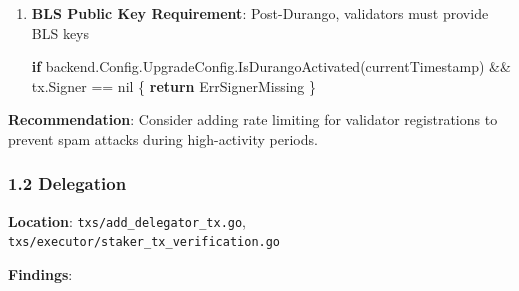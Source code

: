 \documentclass[
]{article}
\newenvironment{Shaded}{}{}
\newcommand{\ControlFlowTok}[1]{\textcolor[rgb]{0.00,0.44,0.13}{\textbf{#1}}}
\newcommand{\NormalTok}[1]{#1}
\newcommand{\OperatorTok}[1]{\textcolor[rgb]{0.40,0.40,0.40}{#1}}
\newcommand{\OtherTok}[1]{\textcolor[rgb]{0.00,0.44,0.13}{#1}}
\begin{document}
\begin{enumerate}
\begin{Shaded}
\begin{Highlighting}[]
\ControlFlowTok{if}\NormalTok{ chainState}\OperatorTok{.}\NormalTok{GetCurrentValidator}\OperatorTok{(}\NormalTok{constants}\OperatorTok{.}\NormalTok{PrimaryNetworkID}\OperatorTok{,}\NormalTok{ nodeID}\OperatorTok{)} \OperatorTok{!=} \OtherTok{nil} \OperatorTok{\{}
    \ControlFlowTok{return}\NormalTok{ ErrAlreadyValidator}
\OperatorTok{\}}
\ControlFlowTok{if}\NormalTok{ chainState}\OperatorTok{.}\NormalTok{GetPendingValidator}\OperatorTok{(}\NormalTok{constants}\OperatorTok{.}\NormalTok{PrimaryNetworkID}\OperatorTok{,}\NormalTok{ nodeID}\OperatorTok{)} \OperatorTok{!=} \OtherTok{nil} \OperatorTok{\{}
    \ControlFlowTok{return}\NormalTok{ ErrAlreadyValidator}
\OperatorTok{\}}
\end{Highlighting}
\end{Shaded}
\item
  \textbf{BLS Public Key Requirement}: Post-Durango, validators must
  provide BLS keys

\begin{Shaded}
\begin{Highlighting}[]
\ControlFlowTok{if}\NormalTok{ backend}\OperatorTok{.}\NormalTok{Config}\OperatorTok{.}\NormalTok{UpgradeConfig}\OperatorTok{.}\NormalTok{IsDurangoActivated}\OperatorTok{(}\NormalTok{currentTimestamp}\OperatorTok{)} \OperatorTok{\&\&}\NormalTok{ tx}\OperatorTok{.}\NormalTok{Signer }\OperatorTok{==} \OtherTok{nil} \OperatorTok{\{}
    \ControlFlowTok{return}\NormalTok{ ErrSignerMissing}
\OperatorTok{\}}
\end{Highlighting}
\end{Shaded}
\end{enumerate}

\textbf{Recommendation}: Consider adding rate limiting for validator
registrations to prevent spam attacks during high-activity periods.

\subsubsection{1.2 Delegation}\label{12-delegation}

\textbf{Location}: \texttt{txs/add\_delegator\_tx.go},
\texttt{txs/executor/staker\_tx\_verification.go}

\textbf{Findings}:
\end{document}
